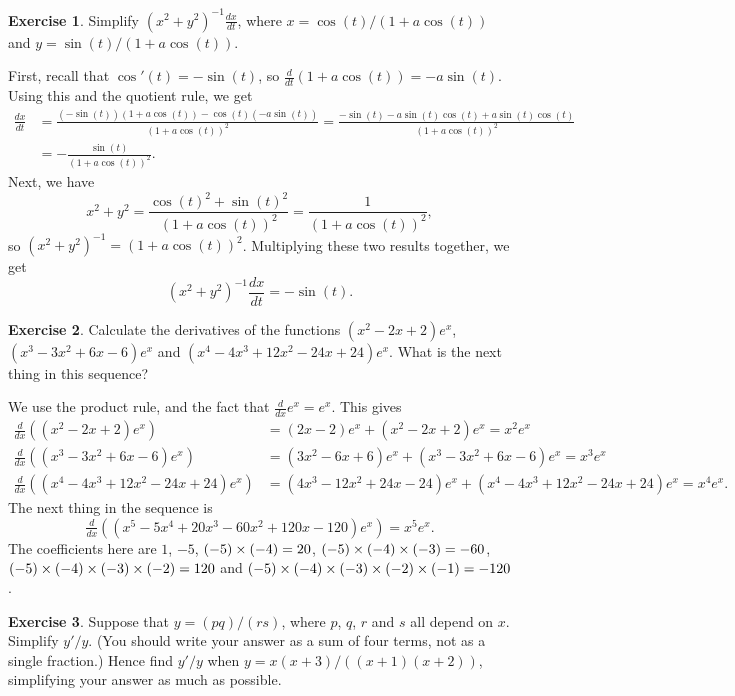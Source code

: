 \documentclass[a4paper]{amsart}
\theoremstyle{definition}
\newtheorem{exercise}{Exercise}[section]
\newenvironment{solution}{{\noindent \bf Solution:}}{}
\begin{document}
\begin{exercise}\label{ex-diff-kepler}
Simplify $(x^2+y^2)^{-1}\tfrac{dx}{dt}$, where 
 $x=\cos(t)/(1+a\cos(t))$ and $y=\sin(t)/(1+a\cos(t))$.
\end{exercise}
\begin{solution}
First, recall that $\cos'(t)=-\sin(t)$, so
 $\tfrac{d}{dt}(1+a\cos(t))=-a\sin(t)$.  Using this and the
 quotient rule, we get 
 \begin{align*}
  \frac{dx}{dt} &=
   \frac{(-\sin(t))(1+a\cos(t)) - \cos(t)(-a\sin(t))}
        {(1+a\cos(t))^2} 
   = \frac{-\sin(t) - a\sin(t)\cos(t) + a\sin(t)\cos(t)}
          {(1+a\cos(t))^2} \\
   &= -\frac{\sin(t)}{(1+a\cos(t))^2}.
 \end{align*}
 Next, we have
 \[ x^2+y^2 = \frac{\cos(t)^2 + \sin(t)^2}{(1+a\cos(t))^2}
     = \frac{1}{(1+a\cos(t))^2},
 \] 
 so $(x^2+y^2)^{-1}=(1+a\cos(t))^2$.  Multiplying these two
 results together, we get
 \[ (x^2+y^2)^{-1}\frac{dx}{dt} = -\sin(t). \]
\end{solution}
\begin{exercise}\label{ex-diff-poly-log}
Calculate the derivatives of the functions $(x^2-2x+2)e^x$,
 $(x^3-3x^2+6x-6)e^x$ and $(x^4-4x^3+12x^2-24x+24)e^x$.
 What is the next thing in this sequence?
\end{exercise}
\begin{solution}
We use the product rule, and the fact that
 $\tfrac{d}{dx}e^x=e^x$.  This gives
 \begin{align*}
  \tfrac{d}{dx}((x^2-2x+2)e^x) 
   &= (2x-2)e^x + (x^2-2x+2)e^x = x^2e^x \\
  \tfrac{d}{dx}((x^3-3x^2+6x-6)e^x) 
   &= (3x^2-6x+6)e^x + (x^3-3x^2+6x-6)e^x = x^3 e^x \\
  \tfrac{d}{dx}((x^4-4x^3+12x^2-24x+24)e^x)
   &= (4x^3-12x^2+24x-24)e^x +
      (x^4-4x^3+12x^2-24x+24)e^x = x^4e^x.
 \end{align*}
 The next thing in the sequence is
 \[ \tfrac{d}{dx}((x^5-5x^4+20x^3-60x^2+120x-120)e^x) =
     x^5 e^x.
 \]
 The coefficients here are $1$, $-5$, $(-5)\times(-4)=20$,
 $(-5)\times(-4)\times(-3)=-60$, $(-5)\times(-4)\times(-3)\times(-2)=120$
 and $(-5)\times(-4)\times(-3)\times(-2)\times(-1)=-120$.
\end{solution}
\begin{exercise}\label{ex-prod-quot}
Suppose that $y=(pq)/(rs)$, where $p$, $q$, $r$ and $s$ all depend on
 $x$.  Simplify $y'/y$.  (You should write your answer as a sum of
 four terms, not as a single fraction.)  Hence find $y'/y$
 when $y=x(x+3)/((x+1)(x+2))$, simplifying your answer as
 much as possible.
\end{exercise}
\end{document}

